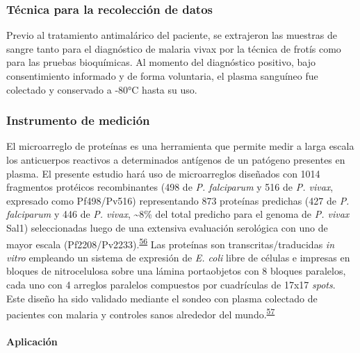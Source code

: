 \documentclass[]{article}
\let\oldparagraph\paragraph
\renewcommand{\paragraph}[1]{\oldparagraph{#1}\mbox{}}
\begin{document}
\subsubsection{Técnica para la recolección de
datos}\label{tecnica-para-la-recoleccion-de-datos}

Previo al tratamiento antimalárico del paciente, se extrajeron las
muestras de sangre tanto para el diagnóstico de malaria vivax por la
técnica de frotís como para las pruebas bioquímicas. Al momento del
diagnóstico positivo, bajo consentimiento informado y de forma
voluntaria, el plasma sanguíneo fue colectado y conservado a -80°C hasta
su uso.

\subsubsection{Instrumento de medición}\label{instrumento-de-medicion}

El microarreglo de proteínas es una herramienta que permite medir a
larga escala los anticuerpos reactivos a determinados antígenos de un
patógeno presentes en plasma. El presente estudio hará uso de
microarreglos diseñados con 1014 fragmentos protéicos recombinantes (498
de \emph{P. falciparum} y 516 de \emph{P. vivax}, expresado como
Pf498/Pv516) representando 873 proteínas predichas (427 de \emph{P.
falciparum} y 446 de \emph{P. vivax}, \textasciitilde{}8\% del total
predicho para el genoma de \emph{P. vivax} Sal1) seleccionadas luego de
una extensiva evaluación serológica con uno de mayor escala
(Pf2208/Pv2233).\textsuperscript{\protect\hyperlink{ref-Finney2014}{56}}
Las proteínas son transcritas/traducidas \emph{in vitro} empleando un
sistema de expresión de \emph{E. coli} libre de células e impresas en
bloques de nitrocelulosa sobre una lámina portaobjetos con 8 bloques
paralelos, cada uno con 4 arreglos paralelos compuestos por cuadrículas
de 17x17 \emph{spots}. Este diseño ha sido validado mediante el sondeo
con plasma colectado de pacientes con malaria y controles sanos
alrededor del
mundo.\textsuperscript{\protect\hyperlink{ref-King2015FOC}{57}}

\paragraph{Aplicación}\label{aplicacion}
\end{document}
